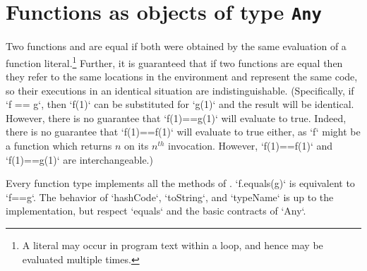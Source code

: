 \section{Functions as objects of type {\tt Any}}
\label{FunctionAnyMethods}

\label{FunctionEquality}
  Two functions  and
 are equal if both were obtained by the same evaluation of a function
literal.\footnote{A literal may occur in program text within a loop, and hence
  may be evaluated multiple times.} Further, it is guaranteed that if two
functions are equal then they refer to the same locations in the environment
and represent the same code, so their executions in an identical situation are
indistinguishable. (Specifically, if \xcd`f == g`, then \xcd`f(1)` can be
substituted for \xcd`g(1)` and the result will be identical. However, there is
no guarantee that \xcd`f(1)==g(1)` will evaluate to true. Indeed, there is no
guarantee that \xcd`f(1)==f(1)` will evaluate to true either, as \xcd`f` might
be a function which returns {$n$} on its {$n^{th}$} invocation. However,
\xcd`f(1)==f(1)` and \xcd`f(1)==g(1)` are interchangeable.)


Every function type implements all the methods of .
\xcd`f.equals(g)` is equivalent to \xcd`f==g`.  The behavior of   \xcd`hashCode`, 
\xcd`toString`, and \xcd`typeName` is up to the implementation, but 
respect \xcd`equals` and the basic contracts of \xcd`Any`. 

